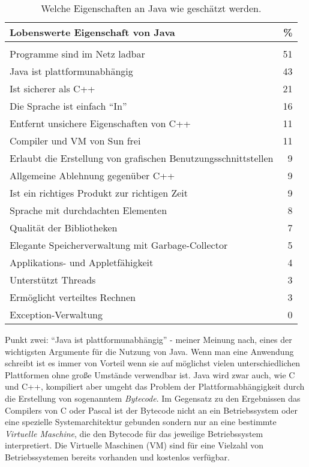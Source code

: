 \begin{table}[h]
\begin{tabular}{lr}
\hline
Lobenswerte Eigenschaft von Java                               & \%\\
\hline\\
Programme sind im Netz ladbar                                  & 51\\
Java ist plattformunabh\"angig                                 & 43\\
Ist sicherer als C++                                           & 21\\
Die Sprache ist einfach ``In''                                 & 16\\
Entfernt unsichere Eigenschaften von C++                       & 11\\
Compiler und VM von Sun frei                                   & 11\\
Erlaubt die Erstellung von grafischen Benutzungsschnittstellen & 9\\
Allgemeine Ablehnung gegen\"uber C++                           & 9\\
Ist ein richtiges Produkt zur richtigen Zeit                   & 9\\
Sprache mit durchdachten Elementen                             & 8\\
Qualit\"at der Bibliotheken                                    & 7\\
Elegante Speicherverwaltung mit Garbage-Collector              & 5\\
Applikations- und Appletf\"ahigkeit                            & 4\\
Unterst\"utzt Threads                                          & 3\\
Erm\"oglicht verteiltes Rechnen                                & 3\\
Exception-Verwaltung                                           & 0\\
\end{tabular}
\caption{Welche Eigenschaften an Java wie gesch\"atzt werden.}
\end{table}

Punkt zwei: ``Java ist plattformunabh\"angig'' - meiner Meinung nach, eines der wichtigsten
Argumente f\"ur die Nutzung von Java. Wenn man eine Anwendung schreibt ist es immer von Vorteil
wenn sie auf m\"oglichst vielen unterschiedlichen Plattformen ohne gro{\ss}e Umst\"ande verwendbar
ist. Java wird zwar auch, wie C und C++, kompiliert aber umgeht das Problem der Plattformabh\"angigkeit
durch die Erstellung von sogenanntem {\it Bytecode}. Im Gegensatz zu den Ergebnissen das Compilers
von C oder Pascal ist der Bytecode nicht an ein Betriebssystem oder eine spezielle Systemarchitektur
gebunden sondern nur an eine bestimmte {\it Virtuelle Maschine}, die den Bytecode f\"ur das 
jeweilige Betriebssystem interpretiert. Die Virtuelle Maschinen (VM) sind f\"ur eine Vielzahl
von Betriebssystemen bereits vorhanden und kostenlos verf\"ugbar.

